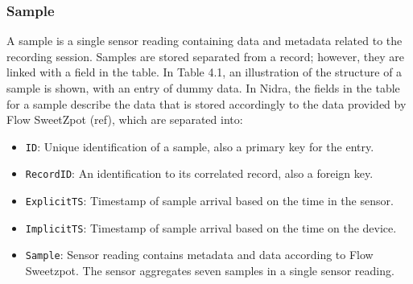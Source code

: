 \begin{table}
\begin{center}
\caption{Example entry in record table}
\end{center}
\end{table}


\subsubsection{Sample} \label{ssec:sample}
A sample is a single sensor reading containing data and metadata related to the recording session. Samples are stored separated from a record; however, they are linked with a field in the table.  In Table 4.1, an illustration of the structure of a sample is shown, with an entry of dummy data. In Nidra, the fields in the table for a sample describe the data that is stored accordingly to the data provided by Flow SweetZpot (ref), which are separated into:
\begin{itemize}
	\item \verb|ID|: Unique identification of a sample, also a primary key for the entry.
	\item \verb|RecordID|: An identification to its correlated record, also a foreign key. 
	\item \verb|ExplicitTS|: Timestamp of sample arrival based on the time in the sensor. 
	\item \verb|ImplicitTS|: Timestamp of sample arrival based on the time on the device. 
	\item \verb|Sample|: Sensor reading contains metadata and data according to Flow Sweetzpot. The sensor aggregates seven samples in a single sensor reading. 
\end{itemize}

\begin{table}
\begin{center}
\caption{Example entry in sample table}
\end{center}
\end{table}


